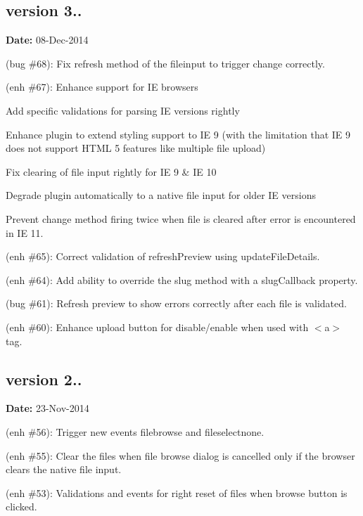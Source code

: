 \subsection*{version 3..}

{\bfseries Date\+:} 08-\/\+Dec-\/2014


\begin{DoxyItemize}
\item (bug \#68)\+: Fix refresh method of the fileinput to trigger change correctly.
\item (enh \#67)\+: Enhance support for IE browsers
\begin{DoxyItemize}
\item Add specific validations for parsing IE versions rightly
\item Enhance plugin to extend styling support to IE 9 (with the limitation that IE 9 does not support H\+T\+ML 5 features like multiple file upload)
\item Fix clearing of file input rightly for IE 9 \& IE 10
\item Degrade plugin automatically to a native file input for older IE versions
\item Prevent change method firing twice when file is cleared after error is encountered in IE 11.
\end{DoxyItemize}
\item (enh \#65)\+: Correct validation of {\ttfamily refresh\+Preview} using {\ttfamily update\+File\+Details}.
\item (enh \#64)\+: Add ability to override the slug method with a {\ttfamily slug\+Callback} property.
\item (bug \#61)\+: Refresh preview to show errors correctly after each file is validated.
\item (enh \#60)\+: Enhance upload button for disable/enable when used with {\ttfamily $<$a$>$} tag.
\end{DoxyItemize}

\subsection*{version 2..}

{\bfseries Date\+:} 23-\/\+Nov-\/2014


\begin{DoxyItemize}
\item (enh \#56)\+: Trigger new events {\ttfamily filebrowse} and {\ttfamily fileselectnone}.
\item (enh \#55)\+: Clear the files when file browse dialog is cancelled only if the browser clears the native file input.
\item (enh \#53)\+: Validations and events for right reset of files when browse button is clicked.
\end{DoxyItemize}

